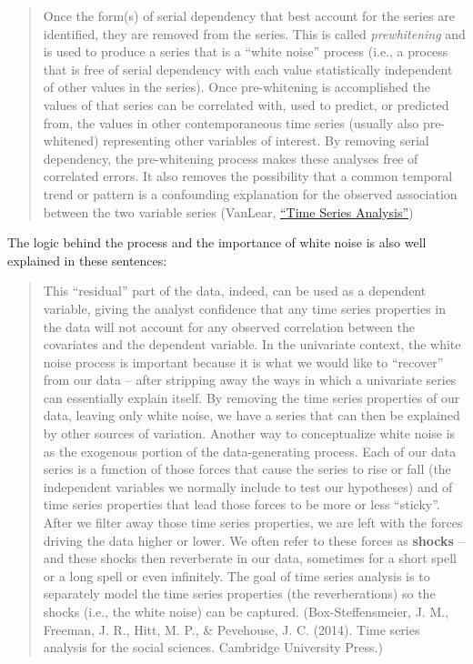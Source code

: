 \documentclass[
]{article}
\begin{document}
\begin{quote}
Once the form(s) of serial dependency that best account for the series are identified, they are removed from the series. This is called \emph{prewhitening} and is used to produce a series that is a ``white noise'' process (i.e., a process that is free of serial dependency with each value statistically independent of other values in the series). Once pre-whitening is accomplished the values of that series can be correlated with, used to predict, or predicted from, the values in other contemporaneous time series (usually also pre-whitened) representing other variables of interest. By removing serial dependency, the pre-whitening process makes these analyses free of correlated errors. It also removes the possibility that a common temporal trend or pattern is a confounding explanation for the observed association between the two variable series (VanLear, \href{https://us.sagepub.com/en-us/nam/the-sage-encyclopedia-of-communication-research-methods/book244974}{``Time Series Analysis''})
\end{quote}

The logic behind the process and the importance of white noise is also well explained in these sentences:

\begin{quote}
This ``residual'' part of the data, indeed, can be used as a dependent variable, giving the analyst confidence that any time series properties in the data will not account for any observed correlation between the covariates and the dependent variable. In the univariate context, the white noise process is important because it is what we would like to ``recover'' from our data -- after stripping away the ways in which a univariate
series can essentially explain itself. By removing the time series properties of our data, leaving only white noise, we have a series that can then be explained by other sources of variation. Another way to conceptualize white noise is as the exogenous portion of the data-generating process. Each of our data series is a function of those forces that cause the series to rise or fall (the independent variables we normally include to test our hypotheses) and of time series properties that lead those forces to
be more or less ``sticky''. After we filter away those time series properties, we are left with the forces driving the data higher or lower. We often refer to these forces as \textbf{shocks} -- and these shocks then reverberate in our data, sometimes for a short spell or a long spell or even infinitely. The goal of time series analysis is to separately model the time series properties (the reverberations) so the shocks (i.e., the white noise) can be captured. (Box-Steffensmeier, J. M., Freeman, J. R., Hitt, M. P., \& Pevehouse, J. C. (2014). Time series analysis for the social sciences. Cambridge University Press.)
\end{quote}
\end{document}
